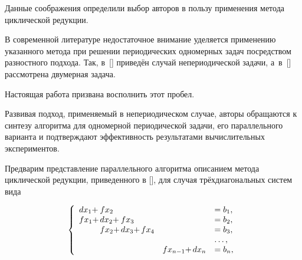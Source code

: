 Данные соображения определили выбор авторов в пользу применения метода циклической редукции.



В современной литературе недостаточное внимание уделяется применению указанного метода при решении периодических одномерных задач посредством разностного подхода. Так, в~[] приведён случай непериодической задачи, а~в~[] рассмотрена двумерная задача. 

Настоящая работа призвана восполнить этот пробел.



Развивая подход, применяемый в непериодическом случае, авторы обращаются к синтезу алгоритма для одномерной периодической задачи, его параллельного варианта и подтверждают эффективность результатами вычислительных экспериментов.




  Предварим представление параллельного алгоритма описанием метода циклической редукции, приведенного в [], для случая трёхдиагональных систем вида

  \begin{equation}

  \left\{

  \begin{array}{llllllllllllll}

  dx_1 +  & \hspace{-3mm} fx_2   &        &      &    &  &=b_1,\\

  fx_1 +  & \hspace{-3mm} dx_2 + & \hspace{-3mm} fx_3   &      &    &  &=b_2,\\

          & \hspace{-3mm} fx_2 + & \hspace{-3mm} dx_3 + & \hspace{-3mm} fx_4 &    &  &=b_3, \\

          &        &        &      &    &  & \dots,\\

          &        &        &      &  fx_{n-1}+  & \hspace{-3mm} dx_n &=b_n,

  \end{array} \right.

  \end{equation}

